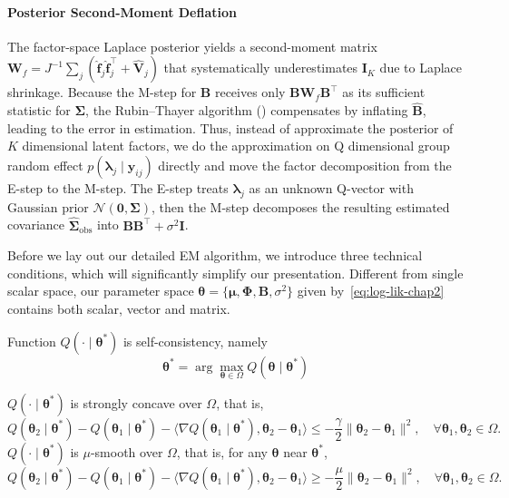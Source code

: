 \paragraph*{Posterior Second-Moment Deflation} The factor-space Laplace posterior yields a second-moment matrix $\mathbf{W}_{f}=J^{-1}\sum_{j}(\hat{\mathbf{f}}_{j}\hat{\mathbf{f}}_{j}^{\top}+\hat{\mathbf{V}}_{j})$ that systematically underestimates $\mathbf{I}_{K}$ due to Laplace shrinkage. Because the M-step for $\mathbf{B}$ receives only $\mathbf{BW}_{f}\mathbf{B}^{\top}$ as its sufficient statistic for $\bm{\Sigma}$, the Rubin–Thayer algorithm (\citet{Rubin1982}) compensates by inflating $\hat{\mathbf{B}}$, leading to the error in estimation. 
Thus, instead of approximate the posterior of $K$ dimensional latent factors, we do the approximation on Q dimensional group random effect $p(\bm{\lambda}_{j}\mid \bm{y}_{ij})$ directly and move the factor decomposition from the E-step to the M-step. The E-step treats $\bm{\lambda}_{j}$ as an unknown Q-vector with Gaussian prior $\mathcal{N}(\bm{0},\bm{\Sigma})$, then the M-step decomposes the resulting estimated covariance $\hat{\bm{\Sigma}}_{\text{obs}}$ into $\mathbf{BB}^{\top}+\sigma^{2}\mathbf{I}$.
\fi
\iffalse

Before we lay out our detailed EM algorithm, we introduce three technical conditions, which will significantly simplify our presentation. Different from single scalar space, our parameter space $\bm{\theta}=\{\bm{\mu}, \bm{\Phi}, \mathbf{B},\sigma^{2}\}$ given by~\eqref{eq:log-lik-chap2} contains both scalar, vector and matrix.

\begin{condition}
Function $Q(\cdot\mid \bm{\theta^{*}})$ is self-consistency, namely
\begin{equation}
    \bm{\theta^{*}}=\arg\max_{\bm{\theta}\in \Omega} Q(\bm{\theta}\mid \bm{\theta^{*}})
    \label{eq:self-consistency}
\end{equation}
\end{condition}

\begin{condition}
$Q(\cdot\mid \bm{\theta^{*}})$ is strongly concave over $\Omega$, that is,
\begin{equation}
    Q(\bm{\theta}_{2}\mid \bm{\theta^{*}})-Q(\bm{\theta}_{1}\mid \bm{\theta^{*}})-\langle \nabla Q(\bm{\theta}_{1}\mid \bm{\theta^{*}}), \bm{\theta}_{2}-\bm{\theta}_{1}\rangle\leq -\frac{\gamma}{2}\|\bm{\theta}_{2}-\bm{\theta}_{1}\|^{2}, \quad \forall \bm{\theta}_{1},\bm{\theta}_{2}\in \Omega.
    \label{eq:strong-concave}
\end{equation}
$Q(\cdot\mid \bm{\theta^{*}})$ is $\mu$-smooth over $\Omega$, that is, for any $\bm{\theta}$ near $\bm{\theta}^{*}$,
\begin{equation}
    Q(\bm{\theta}_{2}\mid \bm{\theta^{*}})-Q(\bm{\theta}_{1}\mid \bm{\theta^{*}})-\langle \nabla Q(\bm{\theta}_{1}\mid \bm{\theta^{*}}), \bm{\theta}_{2}-\bm{\theta}_{1}\rangle\geq -\frac{\mu}{2}\|\bm{\theta}_{2}-\bm{\theta}_{1}\|^{2}, \quad \forall \bm{\theta}_{1},\bm{\theta}_{2}\in \Omega.
    \label{eq:smooth}
\end{equation}
\end{condition}

